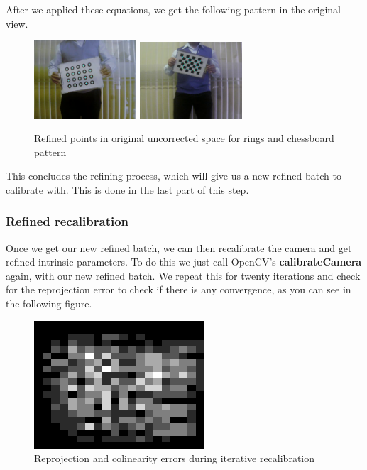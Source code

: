 \documentclass[journal]{IEEEtran}
\begin{document}
\begin{itemize}
        After we applied these equations, we get the following pattern in the original view.

        \begin{figure}[H]
        \centering
        \includegraphics[width=1.5in]{_img/report_4/img_refinement_distortion.png}
        \includegraphics[width=1.5in]{_img/report_4/img_refinement_distortion_chessboard.png}
        \caption{Refined points in original uncorrected space for rings and chessboard pattern}
        \end{figure}

        This concludes the refining process, which will give us a new refined batch to calibrate with. This is done in the last part of this step.

\end{itemize}

\subsubsection{ \textbf{ Refined recalibration } }

Once we get our new refined batch, we can then recalibrate the camera and get refined intrinsic parameters. To do this we just call OpenCV's \textbf{calibrateCamera} again, with our new refined batch. We repeat this for twenty iterations and check for the reprojection error to check if there is any convergence, as you can see in the following figure.

\begin{figure}[H]
\centering
\includegraphics[width=2.5in]{_img/img_report3_heatmap.png}
\caption{Reprojection and colinearity errors during iterative recalibration}
\end{figure}
\end{document}

